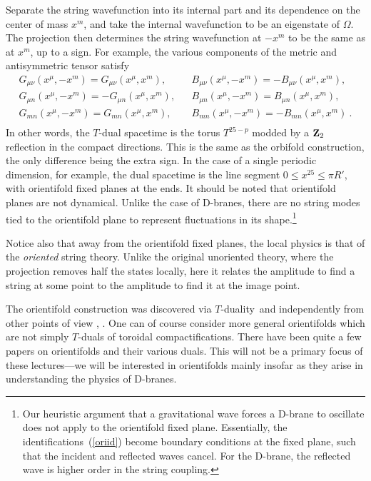 \documentclass[12pt]{article}
\def\bea{\begin{eqnarray}}
\def\eea{\end{eqnarray}}
\def\Z{{\bf Z}}
\begin{document}
Separate the string wavefunction into its internal
part and its dependence on the center of mass $x^m$, and take the internal
wavefunction to be an eigenstate of $\Omega$.  The projection then
determines the string wavefunction at $-x^m$ to be the same as at $x^m$, up
to a sign.  For example, the various components of the metric and
antisymmetric  tensor satisfy
\bea
G_{\mu\nu}(x^\mu,-x^m) = G_{\mu\nu}(x^\mu,x^m),&&
B_{\mu\nu}(x^\mu,-x^m) = -B_{\mu\nu}(x^\mu,x^m), \nonumber\\
G_{\mu n}(x^\mu,-x^m) = -G_{\mu n}(x^\mu,x^m),&&
B_{\mu n}(x^\mu,-x^m) = B_{\mu n}(x^\mu,x^m), \nonumber\\
G_{mn}(x^\mu,-x^m) = G_{mn}(x^\mu,x^m),&&
B_{mn}(x^\mu,-x^m) = -B_{mn}(x^\mu,x^m)\ . \\ \label{oriid}
\eea
In other words, the $T$-dual spacetime is the torus
$T^{25-p}$ modded by a $\Z_2$ reflection in the compact directions.
This is the same as the orbifold construction, the only difference
being the extra sign.
In the case of a single periodic
dimension, for example, the dual spacetime is the line segment $0 \leq x^{25}
\leq
\pi R'$,  with orientifold fixed planes at the ends.  It should be noted that
orientifold planes are not dynamical.  Unlike the case of D-branes, there are
no string modes tied to the orientifold plane to represent fluctuations in its
shape.\footnote{Our heuristic argument that a gravitational wave forces a
D-brane to oscillate does not apply to the orientifold fixed plane. 
Essentially, the identifications~(\ref{oriid}) become boundary conditions at
the fixed plane, such that the incident and reflected waves cancel.  For the
D-brane, the reflected wave is higher order in the string coupling.}  

Notice also that away from
the orientifold fixed planes, the local physics is that of the {\it
oriented} string theory.  Unlike the original unoriented theory, where the
projection removes half the states locally, here it relates the
amplitude to find a string at some point to the amplitude to find it at the
image point.

The orientifold construction was discovered via $T$-duality\, \cite{dlp} and
independently from other points of
view \cite{opentwist}, \cite{laterc}. One can of course consider more
general orientifolds which are not simply
$T$-duals of toroidal compactifications.  There have been quite a few papers
on orientifolds and their various duals.  This will not be a primary focus of
these lectures---we will be interested in orientifolds mainly insofar as they
arise in understanding the physics of D-branes.
\end{document}
